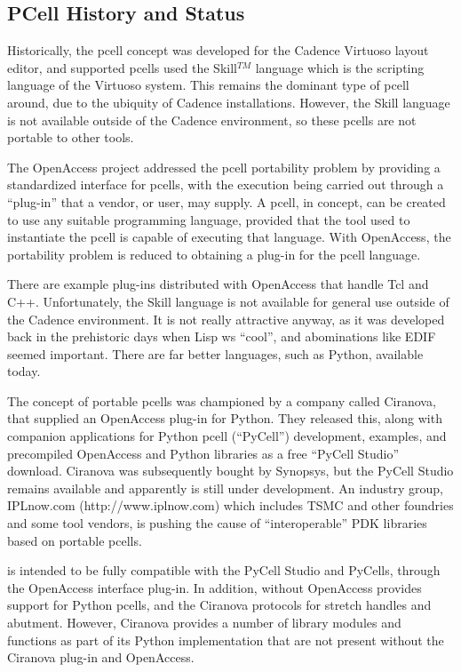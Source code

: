 \subsection{PCell History and Status}

Historically, the pcell concept was developed for the Cadence Virtuoso
layout editor, and supported pcells used the Skill$^{TM}$ language
which is the scripting language of the Virtuoso system.  This remains
the dominant type of pcell around, due to the ubiquity of Cadence
installations.  However, the Skill language is not available outside
of the Cadence environment, so these pcells are not portable to other
tools.

The OpenAccess project addressed the pcell portability problem by
providing a standardized interface for pcells, with the execution
being carried out through a ``plug-in'' that a vendor, or user, may
supply.  A pcell, in concept, can be created to use any suitable
programming language, provided that the tool used to instantiate the
pcell is capable of executing that language.  With OpenAccess, the
portability problem is reduced to obtaining a plug-in for the pcell
language.

There are example plug-ins distributed with OpenAccess that handle Tcl
and C++.  Unfortunately, the Skill language is not available for
general use outside of the Cadence environment.  It is not really
attractive anyway, as it was developed back in the prehistoric days
when Lisp ws ``cool'', and abominations like EDIF seemed important. 
There are far better languages, such as Python, available today.

The concept of portable pcells was championed by a company called
Ciranova, that supplied an OpenAccess plug-in for Python.  They
released this, along with companion applications for Python pcell
(``PyCell'') development, examples, and precompiled OpenAccess and
Python libraries as a free ``PyCell Studio'' download.  Ciranova was
subsequently bought by Synopsys, but the PyCell Studio remains
available and apparently is still under development.  An industry
group, IPLnow.com ({\vt http://www.iplnow.com}) which includes TSMC
and other foundries and some tool vendors, is pushing the cause of
``interoperable'' PDK libraries based on portable pcells.

{\Xic} is intended to be fully compatible with the PyCell Studio and
PyCells, through the OpenAccess interface plug-in.  In addition,
{\Xic} without OpenAccess provides support for Python pcells, and the
Ciranova protocols for stretch handles and abutment.  However,
Ciranova provides a number of library modules and functions as part of
its Python implementation that are not present without the Ciranova
plug-in and OpenAccess.

